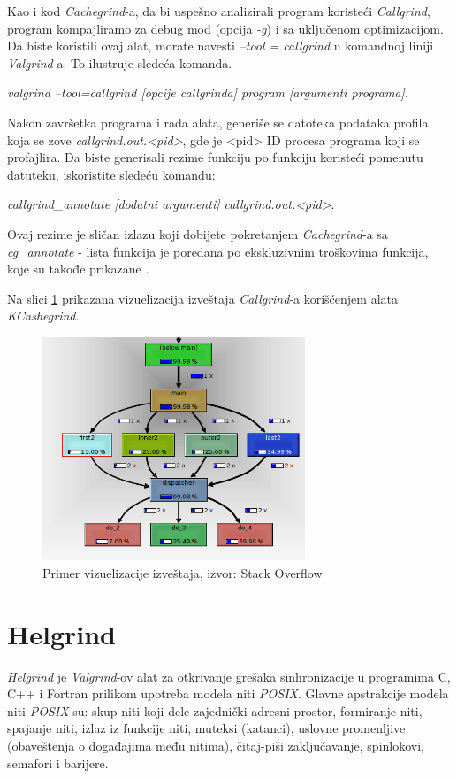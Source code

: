 \documentclass[12pt,oneside]{memoir}
\theoremstyle{plain}
\theoremstyle{definition}
\begin{document}
Kao i kod \textit{Cachegrind}-a, da bi uspešno analizirali program koristeći \textit{Callgrind}, program kompajliramo za debug mod (opcija \textit{-g}) i sa uključenom optimizacijom. Da biste koristili ovaj alat, morate navesti \textit{--tool = callgrind} u komandnoj liniji \textit{Valgrind}-a. To ilustruje sledeća komanda.
\begin{center}
\textit{valgrind --tool=callgrind [opcije callgrinda] program [argumenti programa]}.
\end{center}

Nakon završetka programa i rada alata, generiše se datoteka podataka profila koja se zove \textit{callgrind.out.<pid>}, gde je <pid> ID procesa programa koji se profajlira. Da biste generisali rezime funkciju po funkciju koristeći pomenutu datuteku, iskoristite sledeću komandu:
\begin{center}
\textit{callgrind\_annotate [dodatni argumenti] callgrind.out.<pid>}.
\end{center}

Ovaj rezime je sličan izlazu koji dobijete  pokretanjem \textit{Cachegrind}-a sa \textit{cg\_annotate} -  lista funkcija je poređana po ekskluzivnim troškovima funkcija, koje su takođe  prikazane \cite{Callgrind}. 

Na slici \ref{fig:slika2.18} prikazana vizuelizacija izveštaja \textit{Callgrind}-a korišćenjem alata \textit{KCashegrind}.
\begin{figure}[!ht]
  \centering
  \includegraphics[width=0.7\textwidth]{MUjHe.png}
  \caption{Primer vizuelizacije izveštaja, izvor: Stack Overflow}
  \label{fig:slika2.18}
\end{figure}

\section{Helgrind}\label{HelgrindSection}
\textit{Helgrind} je \textit{Valgrind}-ov alat za otkrivanje grešaka sinhronizacije u programima C, C++ i Fortran prilikom upotreba modela niti \textit{POSIX}. Glavne apstrakcije modela niti  \textit{POSIX} su: skup niti koji dele zajednički adresni prostor, formiranje niti, spajanje niti, izlaz iz funkcije niti, muteksi (katanci), uslovne promenljive (obaveštenja o događajima među nitima), čitaj-piši zaključavanje, spinlokovi, semafori i barijere.
\end{document}
